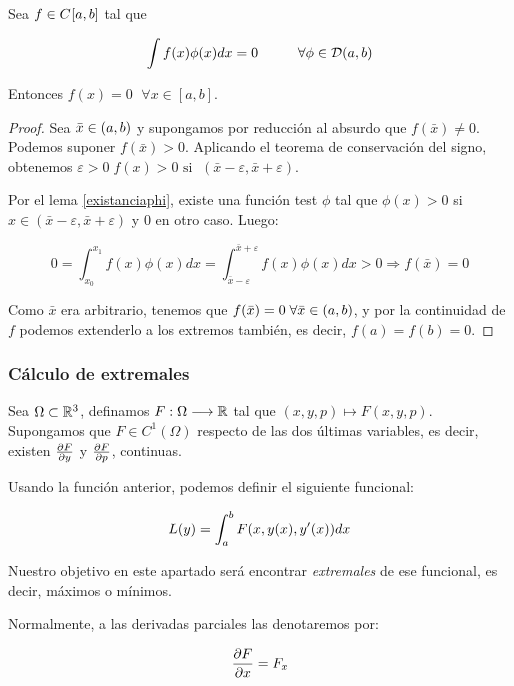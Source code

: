 \begin{theorem}
\label{theorem:1.3}
Sea $f\in C^{  }[a,b]$ tal que

\[
\int f(x)\phi(x)dx=0 \hspace{1cm} \forall \phi \in \mathcal{D}(a,b)
\]

Entonces $f(x)=0 \;$  $\forall x\in [a,b]$.

\end{theorem}

\begin{proof}

Sea $\bar{x}\in (a,b)$ y supongamos por reducción al absurdo que $f(\bar{x})\neq 0$. Podemos suponer $f(\bar{x})>0$. Aplicando el teorema de conservación del signo, obtenemos $\varepsilon>0 \; f(x)>0 \text{ si } \; (\bar{x}-\varepsilon,\bar{x}+\varepsilon)$.

Por el lema \ref{existanciaphi}, existe una función test $\phi$ tal que $\phi(x)>0$ si $x\in(\bar{x}-\varepsilon, \bar{x}+\varepsilon)$ y $0$ en otro caso. Luego:

\[
0=\int_{x_0}^{x_1}f(x)\phi(x)dx=\int_{\bar{x}-\varepsilon}^{\bar{x}+\varepsilon}f(x)\phi(x)dx>0 \Rightarrow f(\bar{x})=0
\]

Como $\bar{x}$ era arbitrario, tenemos que $f(\bar{x})=0 \; \forall \bar{x}\in(a,b)$, y por la continuidad de $f$ podemos extenderlo a los extremos también, es decir, $f(a)=f(b)=0$.

\end{proof}

\subsubsection{Cálculo de extremales}

Sea $\Omega\subset\mathbb{R}^3$, definamos $F:\Omega \longrightarrow \mathbb{R}$ tal que $(x,y,p)\longmapsto F(x,y,p)$. Supongamos que $F\in C^1(\Omega)$  respecto de las dos últimas variables, es decir, existen $\frac{\partial F }{\partial y }$ y $\frac{\partial F }{\partial p }$, continuas. 

Usando la función anterior, podemos definir el siguiente funcional:

\begin{equation}\label{funcional}
L(y) = \int_{a}^{b}F(x,y(x),y'(x)) dx 
\end{equation}


Nuestro objetivo en este apartado será encontrar \textit{extremales} de ese funcional, es decir, máximos o mínimos.

\begin{notacion}
Normalmente, a las derivadas parciales las denotaremos por:

\[
\frac{\partial F }{\partial x }=F_x
\]

\end{notacion}

